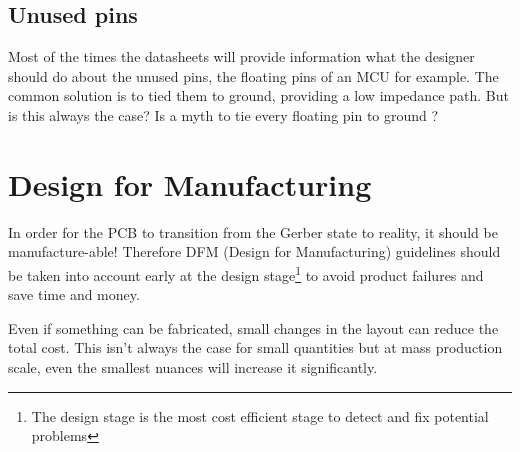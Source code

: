 \documentclass[final]{cubedoc}
\begin{document}
	\subsection{Unused pins}
	
	Most of the times the datasheets will provide information what the designer should do about the unused pins, the floating pins of an MCU for example. The common solution is to tied them to ground, providing a low impedance path. But is this always the case? Is a myth to tie every floating pin to ground \cite{learnemc:myth}?
	
	
	
	
	
	\section{Design for Manufacturing}
	
	In order for the PCB to transition from the Gerber state to reality, it should be manufacture-able! Therefore DFM (Design for Manufacturing) guidelines should be taken into account early at the design stage\footnote{The design stage is the most cost efficient stage to detect and fix potential problems} to avoid product failures and save time and money. 
	
	Even if something can be fabricated, small changes in the layout can reduce the total cost. This isn't always the case for small quantities but at mass production scale, even the smallest nuances will increase it significantly. 
	
\end{document}
